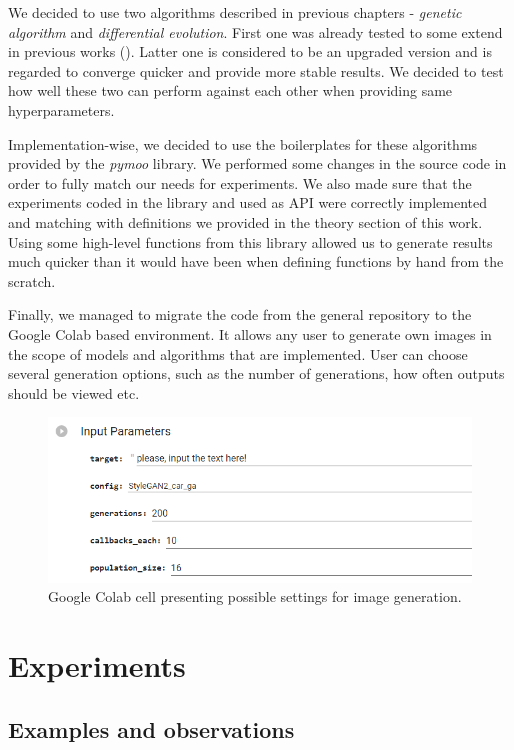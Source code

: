 \documentclass[12pt,a4paper,openany]{book}
\begin{document}
\noindent We decided to use two algorithms described in previous chapters - \textit{genetic algorithm} and \textit{differential evolution}. First one was already tested to some extend in previous works (\cite{coimbra}). Latter one is considered to be an upgraded version and is regarded to converge quicker and provide more stable results. We decided to test how well these two can perform against each other when providing same hyperparameters.

\noindent Implementation-wise, we decided to use the boilerplates for these algorithms provided by the \textit{pymoo} \cite{pymoo} library. We performed some changes in the source code in order to fully match our needs for experiments. We also made sure that the experiments coded in the library and used as API were correctly implemented and matching with definitions we provided in the theory section of this work. Using some high-level functions from this library allowed us to generate results much quicker than it would have been when defining functions by hand from the scratch.

\noindent Finally, we managed to migrate the code from the general repository to the Google Colab based environment. It allows any user to generate own images in the scope of models and algorithms that are implemented. User can choose several generation options, such as the number of generations, how often outputs should be viewed etc.

\begin{figure}[H]
    \centering
    \includegraphics[scale=0.8]{figs/collab.png}
    \caption{Google Colab cell presenting possible settings for image generation.}\label{Fig:collab}
\end{figure}


\chapter{Experiments}

\section{Examples and observations}
\end{document}
